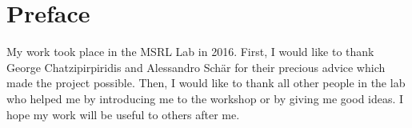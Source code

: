 \section*{Preface}

My work took place in the MSRL Lab in 2016. First, I would like to thank George Chatzipirpiridis and Alessandro Schär for their precious advice which made the project possible. Then, I would like to thank all other people in the lab who helped me by introducing me to the workshop or by giving me good ideas.
I hope my work will be useful to others after me.
